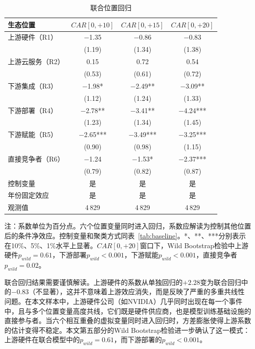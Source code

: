 \documentclass[11pt,fontset=fandol,a4paper]{ctexart}
\begin{document}
\begin{table}[H]
\centering
\small
\begin{threeparttable}
\caption{联合位置回归}
\label{tab:joint}
\begin{tabular}{lccc}
\toprule
生态位置 & $CAR[0,+10]$ & $CAR[0,+15]$ & $CAR[0,+20]$ \\
\midrule
上游硬件（R1） & $-$1.35 & $-$0.86 & $-$0.83 \\
 & (1.19) & (1.34) & (1.38) \\[3pt]
上游云服务（R2） & 0.15 & 0.72 & 0.54 \\
 & (0.53) & (0.61) & (0.72) \\[3pt]
下游集成（R3） & $-$1.98* & $-$2.49** & $-$3.09** \\
 & (1.12) & (1.24) & (1.33) \\[3pt]
下游部署（R4） & $-$2.78** & $-$3.41** & $-$4.24*** \\
 & (1.23) & (1.34) & (1.45) \\[3pt]
下游赋能（R5） & $-$2.65*** & $-$3.49*** & $-$3.25*** \\
 & (0.90) & (0.98) & (1.15) \\[3pt]
直接竞争者（R6） & $-$1.24 & $-$1.53* & $-$2.37*** \\
 & (0.79) & (0.82) & (0.87) \\
\midrule
控制变量 & 是 & 是 & 是 \\
年份固定效应 & 是 & 是 & 是 \\
观测值 & 4\,829 & 4\,829 & 4\,829 \\
\bottomrule
\end{tabular}
\begin{tablenotes}
\footnotesize
\item 注：系数单位为百分点。六个位置变量同时进入回归，系数应解读为控制其他位置后的条件净效应。控制变量和聚类方式同表~\ref{tab:baseline}。*、**、***分别表示在10\%、5\%、1\%水平上显著。$CAR[0,+20]$窗口下，Wild Bootstrap检验中上游硬件$p_{wild}=0.61$，下游部署$p_{wild}<0.001$，下游赋能$p_{wild}<0.001$，直接竞争者$p_{wild}=0.02$。
\end{tablenotes}
\end{threeparttable}
\end{table}

联合回归结果需要谨慎解读。上游硬件的系数从单独回归的$+2.28$变为联合回归中的$-0.83$（不显著），这并不意味着上游效应消失，而是反映了严重的多重共线性问题。在本文样本中，上游硬件公司（如NVIDIA）几乎同时出现在每一个事件中，且与多个位置变量高度共线，它们既是硬件供应商，也是模型训练基础设施的直接参与者。当六个相互重叠的虚拟变量同时进入回归时，方差膨胀使得上游系数的估计变得不稳定。本文第五部分的Wild Bootstrap检验进一步确认了这一模式：上游硬件在联合模型中的$p_{wild}=0.61$，而下游部署的$p_{wild}<0.001$。
\end{document}
